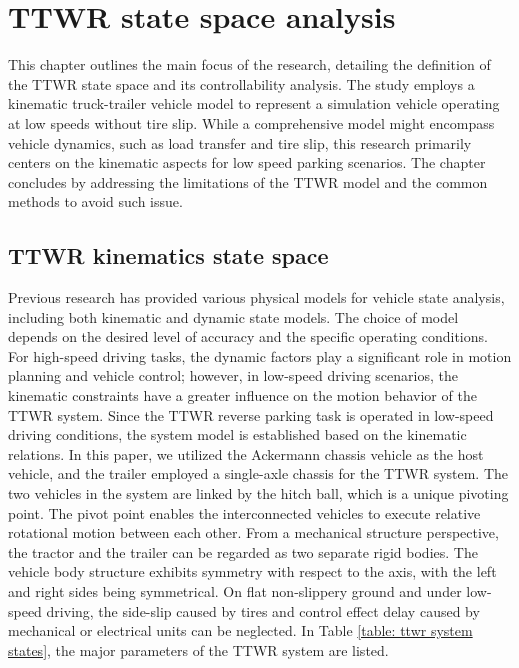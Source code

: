 \chapter{\leavevmode\newline TTWR state space analysis}
\label{chap:TTWR state space analysis}

This chapter outlines the main focus of the research, detailing the definition of the TTWR state space and its controllability analysis. The study employs a kinematic truck-trailer vehicle model to represent a simulation vehicle operating at low speeds without tire slip. While a comprehensive model might encompass vehicle dynamics, such as load transfer and tire slip, this research primarily centers on the kinematic aspects for low speed parking scenarios. The chapter concludes by addressing the limitations of the TTWR model and the common methods to avoid such issue.

\section{TTWR kinematics state space}

Previous research \parencite{sorge2019motion}\parencite{liu2019minimum} has provided various physical models for vehicle state analysis, including both kinematic and dynamic state models. The choice of model depends on the desired level of accuracy and the specific operating conditions. For high-speed driving tasks, the dynamic factors play a significant role in motion planning and vehicle control; however, in low-speed driving scenarios, the kinematic constraints have a greater influence on the motion behavior of the TTWR system. Since the TTWR reverse parking task is operated in low-speed driving conditions, the system model is established based on the kinematic relations. In this paper, we utilized the Ackermann chassis vehicle as the host vehicle, and the trailer employed a single-axle chassis for the TTWR system. The two vehicles in the system are linked by the hitch ball, which is a unique pivoting point. The pivot point enables the interconnected vehicles to execute relative rotational motion between each other. From a mechanical structure perspective, the tractor and the trailer can be regarded as two separate rigid bodies. The vehicle body structure exhibits symmetry with respect to the axis, with the left and right sides being symmetrical. On flat non-slippery ground and under low-speed driving, the side-slip caused by tires and control effect delay caused by mechanical or electrical units can be neglected\parencite{lei2021research}. In Table \ref{table: ttwr system states}, the major parameters of the TTWR system are listed.

